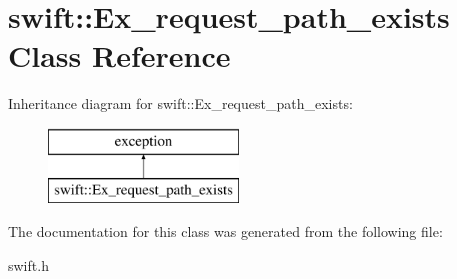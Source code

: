 \hypertarget{classswift_1_1_ex__request__path__exists}{\section{swift\-:\-:Ex\-\_\-request\-\_\-path\-\_\-exists Class Reference}
\label{classswift_1_1_ex__request__path__exists}
}
Inheritance diagram for swift\-:\-:Ex\-\_\-request\-\_\-path\-\_\-exists\-:\begin{figure}[H]
\begin{center}
\leavevmode
\includegraphics[height=2.000000cm]{classswift_1_1_ex__request__path__exists}
\end{center}
\end{figure}


The documentation for this class was generated from the following file\-:\begin{DoxyCompactItemize}
\item 
swift.\-h\end{DoxyCompactItemize}
